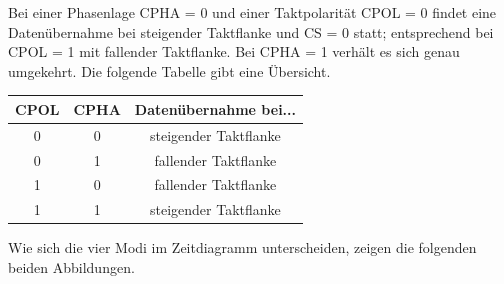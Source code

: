 Bei einer Phasenlage CPHA = 0 und einer Taktpolarität CPOL = 0 findet eine Datenübernahme bei steigender Taktflanke und CS = 0 statt; entsprechend bei CPOL = 1 mit fallender Taktflanke. Bei CPHA = 1 verhält es sich genau umgekehrt. Die folgende Tabelle gibt eine Übersicht.

\begin{table}[H]
	\begin{tabular}{|c|c|c|}
		\hline
		CPOL & CPHA & Datenübernahme bei... \\ \hline
		0    & 0    & steigender Taktflanke \\ \hline
		0    & 1    & fallender Taktflanke  \\ \hline
		1    & 0    & fallender Taktflanke  \\ \hline
		1    & 1    & steigender Taktflanke \\ \hline
	\end{tabular}
\end{table}

Wie sich die vier Modi im Zeitdiagramm unterscheiden, zeigen die folgenden beiden Abbildungen.



